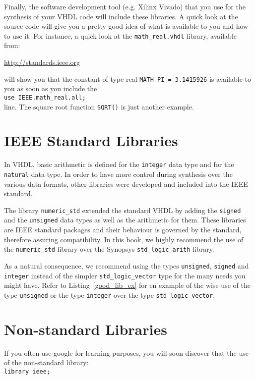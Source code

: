 \noindent
Finally, the software development tool (e.g. Xilinx Vivado) that you use for the synthesis of your VHDL code will include these libraries. A quick look at the source code will give you a pretty good idea of what is available to you and how to use it. For instance, a quick look at the \texttt{math\_real.vhdl} library, available from:

\noindent
\url{http://standards.ieee.org}

\noindent
will show you that the constant of type real \texttt{MATH\_PI = 3.1415926} is available to you as soon as you include the \\
\texttt{use IEEE.math\_real.all;} \\
line. The square root function \texttt{SQRT()} is just another example.

\section{IEEE Standard Libraries}
In VHDL, basic arithmetic is defined for the \texttt{integer} data type and for the \texttt{natural} data type. In order to have more control during synthesis over the various data formats, other libraries were developed and included into the IEEE standard.

The library \texttt{numeric\_std} extended the standard VHDL by adding the \texttt{signed} and the \texttt{unsigned} data types as well as the arithmetic for them. These libraries are IEEE standard packages and their behaviour is governed by the standard, therefore assuring compatibility. In this book, we highly recommend the use of the \texttt{numeric\_std} library over the Synopsys \texttt{std\_logic\_arith} library.

As a natural consequence, we recommend using the types \texttt{unsigned}, \texttt{signed} and \texttt{integer} instead of the simpler \texttt{std\_logic\_vector} type for the many needs you might have. Refer to Listing~\ref{good_lib_ex} for en example of the wise use of the type \texttt{unsigned} or the type \texttt{integer} over the type \texttt{std\_logic\_vector}.

\section{Non-standard Libraries}
If {you often use google for learning purposes}, you will soon discover that the use of the non-standard library:\\
\texttt{library ieee;}

